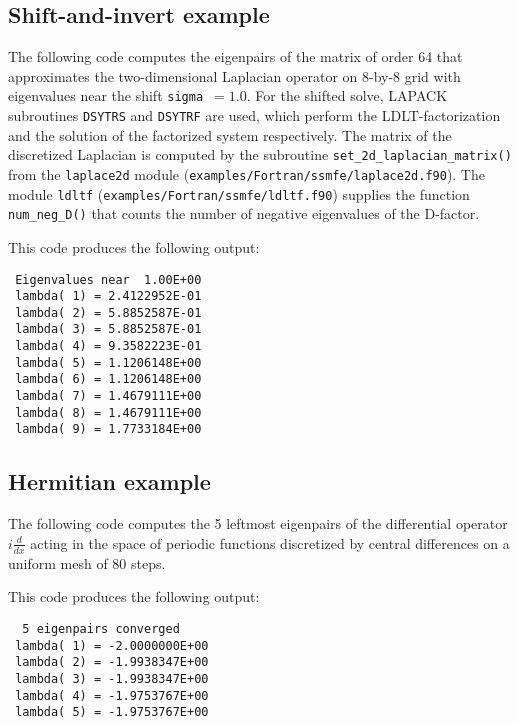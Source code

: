 \subsection{Shift-and-invert example}
\label{sec:ex.si}

The following code 
computes the eigenpairs of 
the matrix of order 64 that approximates 
the two-dimensional Laplacian operator
on 8-by-8 grid
with eigenvalues near the shift {\tt sigma $=1.0$}.
For the shifted solve, LAPACK subroutines {\tt DSYTRS} and
{\tt DSYTRF} are used,
which perform the LDLT-factorization and
the solution of the factorized system respectively.
The matrix of the discretized Laplacian is computed
by the subroutine {\tt set\_2d\_laplacian\_matrix()}
from the {\tt laplace2d} module (\texttt{examples/Fortran/ssmfe/laplace2d.f90}).
The module {\tt ldltf} (\texttt{examples/Fortran/ssmfe/ldltf.f90}) supplies
the function {\tt num\_neg\_D()}
that counts the number of negative eigenvalues of
the D-factor.

This code produces the following output:
\begin{verbatim}
 Eigenvalues near  1.00E+00
 lambda( 1) = 2.4122952E-01
 lambda( 2) = 5.8852587E-01
 lambda( 3) = 5.8852587E-01
 lambda( 4) = 9.3582223E-01
 lambda( 5) = 1.1206148E+00
 lambda( 6) = 1.1206148E+00
 lambda( 7) = 1.4679111E+00
 lambda( 8) = 1.4679111E+00
 lambda( 9) = 1.7733184E+00
\end{verbatim}

\subsection{Hermitian example}
\label{sec:ex.h}

The following code 
computes the 5 leftmost eigenpairs of 
the differential operator $i \frac{d}{dx}$
acting in the space of periodic functions
discretized by central differences on a uniform mesh
of 80 steps.

This code produces the following output:
\begin{verbatim}
  5 eigenpairs converged
 lambda( 1) = -2.0000000E+00
 lambda( 2) = -1.9938347E+00
 lambda( 3) = -1.9938347E+00
 lambda( 4) = -1.9753767E+00
 lambda( 5) = -1.9753767E+00
\end{verbatim}





